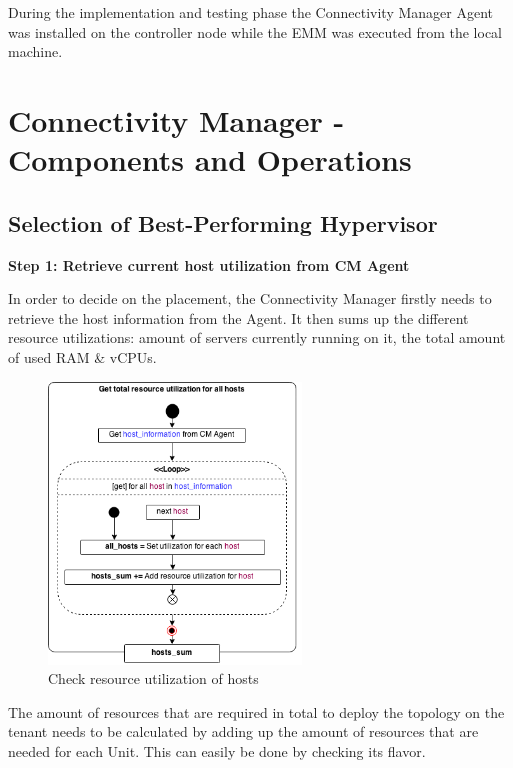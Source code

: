 During the implementation and testing phase the Connectivity Manager Agent was installed on the controller node while the EMM was executed from the local machine.

\newpage
\section{Connectivity Manager - Components and Operations}

\subsection{Selection of Best-Performing Hypervisor}


\textbf{Step 1: Retrieve current host utilization from CM Agent}

In order to decide on the placement, the Connectivity Manager firstly needs to retrieve the host information from the Agent. It then sums up the different resource utilizations: amount of servers currently running on it, the total amount of used RAM \& vCPUs.
\begin{figure}[H]
\centering

\includegraphics[width=0.6\textwidth]{images/implementation/cm_get_host_utilization}

\caption{Check resource utilization of hosts}
\end{figure}

The amount of resources that are required in total to deploy the topology on the tenant needs to be calculated by adding up the amount of resources that are needed for each Unit. This can easily be done by checking its flavor.

